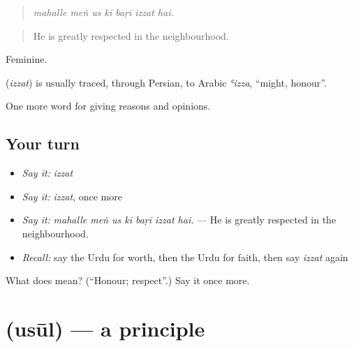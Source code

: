\begin{quote}
      
\end{quote}

\begin{quote}
\emph{mahalle meṅ us kī baṛī izzat hai.}
\end{quote}

\begin{quote}
He is greatly respected in the neighbourhood.
\end{quote}

Feminine.

\begin{cousinweb}
\textbf{} (\emph{izzat}) is usually traced, through Persian, to Arabic \emph{ʿizza}, \textquotedblleft{}might, honour\textquotedblright{}.
\end{cousinweb}

\begin{grammarlens}[title={What you've built}]
One more word for giving reasons and opinions.
\end{grammarlens}

\subsection*{Your turn}
\begin{itemize}
\raggedright
  \item \emph{Say it:} \emph{izzat}
  \item \emph{Say it:} \emph{izzat}, once more
  \item \emph{Say it:} \emph{mahalle meṅ us kī baṛī izzat hai.} — He is greatly respected in the neighbourhood.
  \item \emph{Recall:} say the Urdu for worth, then the Urdu for faith, then say \emph{izzat} again
\end{itemize}

\begin{tcolorbox}[breakable,colback=teal!4,colframe=teal!35!black,title={Before you move on}]
What does  mean? (\textquotedblleft{}Honour; respect\textquotedblright{}.) Say it once more.
\end{tcolorbox}
\section[\texorpdfstring{\ur{اصول} (usūl)}{اصول (usūl)}]{ (usūl) — a principle}

\label{lesson:UR-C345-usul}



